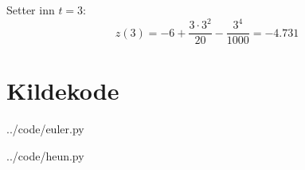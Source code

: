 Setter inn $t=3$:
\begin{equation}
  z(3) = -6 + \frac{3\cdot 3^2}{20} - \frac{3^4}{1000} = -4.731
\end{equation}





\clearpage
\section{Kildekode} %
\label{sec:kildekode}


  {../code/euler.py}


  {../code/heun.py}












